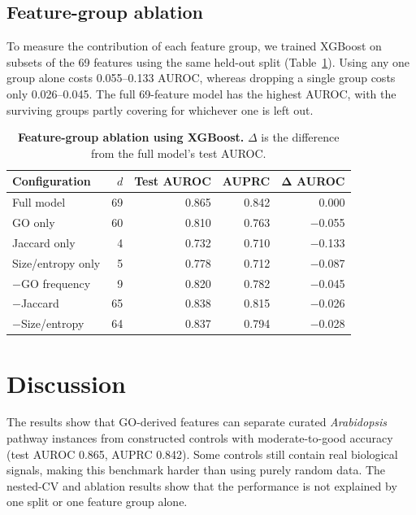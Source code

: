 \documentclass[12pt,letterpaper,oneside,openany]{book}
\begin{document}
\section{Feature-group ablation}
\label{sec:res_ablation}

To measure the contribution of each feature group, we trained XGBoost on subsets of the 69 features using the same held-out split (Table~\ref{tab:s3_ablation}). Using any one group alone costs 0.055--0.133 AUROC, whereas dropping a single group costs only 0.026--0.045. The full 69-feature model has the highest AUROC, with the surviving groups partly covering for whichever one is left out.

\begin{table}[H]
\centering
\caption{\textbf{Feature-group ablation using XGBoost.}
$\Delta$ is the difference from the full model's test AUROC.}
\label{tab:s3_ablation}
\renewcommand{\arraystretch}{1.18}
\setlength{\tabcolsep}{7pt}
\begin{tabular}{lrrrr}
\toprule
\textbf{Configuration} & $d$ & \textbf{Test AUROC} & \textbf{AUPRC} & $\boldsymbol{\Delta}$ AUROC \\
\midrule
Full model & 69 & 0.865 & 0.842 & 0.000 \\
GO only & 60 & 0.810 & 0.763 & $-$0.055 \\
Jaccard only & 4 & 0.732 & 0.710 & $-$0.133 \\
Size/entropy only & 5 & 0.778 & 0.712 & $-$0.087 \\
$-$GO frequency & 9 & 0.820 & 0.782 & $-$0.045 \\
$-$Jaccard & 65 & 0.838 & 0.815 & $-$0.026 \\
$-$Size/entropy & 64 & 0.837 & 0.794 & $-$0.028 \\
\bottomrule
\end{tabular}
\end{table}


\chapter{Discussion}
\label{sec:discussion}

The results show that GO-derived features can separate curated \textit{Arabidopsis} pathway instances from constructed controls with moderate-to-good accuracy (test AUROC 0.865, AUPRC 0.842). Some controls still contain real biological signals, making this benchmark harder than using purely random data. The nested-CV and ablation results show that the performance is not explained by one split or one feature group alone.
\end{document}
